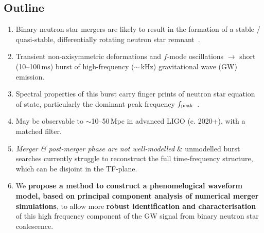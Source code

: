 \documentclass[a0,landscape]{a0poster}
\def\gw#1{gravitational wave#1 (GW#1)\gdef\gw{GW}}
\begin{document}
\begin{multicols}{4}



\color{DarkSlateGray} %

\section*{\centering Outline}

\begin{enumerate}
\item Binary neutron star mergers are likely to result in the formation of a
    stable / quasi-stable, differentially rotating neutron star
    remnant~\cite{shibata:06bns, giacomazzo:11, hotokezaka:11, bauswein:12}.
\item Transient non-axisymmetric deformations and $f$-mode oscillations
    $\rightarrow$ short (10--100\,ms) burst of high-frequency ($\sim $\,kHz)
    \gw{} emission.
\item Spectral properties of this burst carry finger prints of neutron star
    equation of state, particularly the dominant peak frequency $f_{\rm
    peak}$~\cite{hotokezaka:13,bauswein:14}.
\item May be observable to $\sim$10--50\,Mpc in advanced LIGO (c. 2020+), with a matched filter.
\item \emph{Merger \& post-merger phase are not well-modelled} \& unmodelled
    burst searches currently struggle to reconstruct the full time-frequency
    structure, which can be disjoint in the TF-plane.
\item We {\bf propose a method to construct a phenomelogical waveform model,
    based on principal component analysis of numerical merger simulations},
    to allow more {\bf robust identification and characterisation} of this
    high frequency component of the \gw{} signal from binary neutron star coalescence.
\end{enumerate}



\end{multicols}
\end{document}
